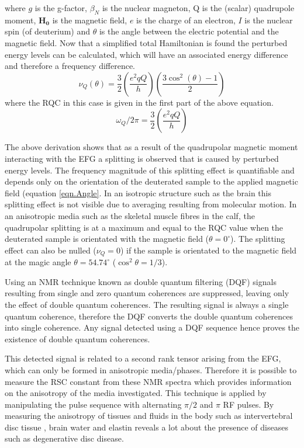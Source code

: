 \documentclass[class=article, crop=false]{standalone}
\begin{document}
where $g$ is the g-factor, $\beta_N$ is the nuclear magneton, Q is the (scalar) quadrupole moment, $\boldsymbol{H_0}$ is the magnetic field, $e$ is the charge of an electron, $I$ is the nuclear spin (of deuterium) and $\theta$ is the angle between the electric potential and the magnetic field. Now that a simplified total Hamiltonian is found the perturbed energy levels can be calculated, which will have an associated energy difference and therefore a frequency difference.
\begin{equation}
    \nu_Q(\theta) = \frac{3}{2}\left(\frac{e^2qQ}{h}\right)\left(\frac{3\cos^2(\theta)-1}{2}\right)
    \label{eqn.Angle}
\end{equation}
where the RQC in this case is given in the first part of the above equation.
\begin{equation}
    \omega_Q/2\pi = \frac{3}{2}\left(\frac{e^2qQ}{h}\right)
    \label{eqn.RQC}
\end{equation}

The above derivation shows that as a result of the quadrupolar magnetic moment interacting with the EFG a splitting is observed that is caused by perturbed energy levels. The frequency magnitude of this splitting effect is quantifiable and depends only on the orientation of the deuterated sample to the applied magnetic field (equation \ref{eqn.Angle}. In an isotropic structure such as the brain this splitting effect is not visible due to averaging resulting from molecular motion. In an anisotropic media such as the skeletal muscle fibres in the calf, the quadrupolar splitting is at a maximum and equal to the RQC value when the deuterated sample is orientated with the magnetic field ($\theta = 0^\circ$). The splitting effect can also be nulled ($\nu_Q = 0$) if the sample is orientated to the magnetic field at the magic angle $\theta = 54.74^\circ$ ($\cos^2\theta=1/3$).

Using an NMR technique known as double quantum filtering (DQF) signals resulting from single and zero quantum coherences are suppressed, leaving only the effect of double quantum coherences. The resulting signal is always a single quantum coherence, therefore the DQF converts the double quantum coherences into single coherence. Any signal detected using a DQF sequence hence proves the existence of double quantum coherences.

This detected signal is related to a second rank tensor arising from the EFG, which can only be formed in anisotropic media/phases. Therefore it is possible to measure the RSC constant from these NMR spectra which provides information on the anisotropy of the media investigated. This technique is applied by manipulating the pulse sequence with alternating $\pi/2$ and $\pi$ RF pulses. By measuring the anisotropy of tissues and fluids in the body such as intervertebral disc tissue \cite{Ooms2015DoubleTissue}, brain water\cite{Assaf1997InSpectroscopy} and elastin\cite{Sun2010InvestigationNMR} reveals a lot about the presence of diseases such as degenerative disc disease\cite{Ooms2015DoubleTissue}.
\end{document}
